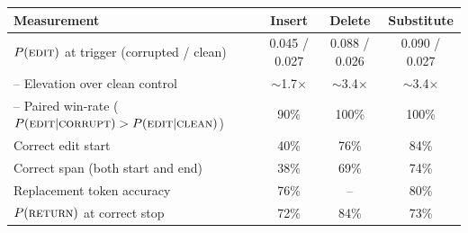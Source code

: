 

\begin{minipage}{19cm}
\centering
\small
\begin{tabular}{lccc}
    \toprule
    Measurement & Insert & Delete & Substitute \\
    \midrule
    $P(\textsc{edit})$ at trigger (corrupted / clean) & 0.045 / 0.027 & 0.088 / 0.026 & 0.090 / 0.027 \\
    \quad -- Elevation over clean control & $\sim$1.7$\times$ & $\sim$3.4$\times$ & $\sim$3.4$\times$ \\
    \quad -- Paired win-rate ($P(\textsc{edit}|\textsc{corrupt}) > P(\textsc{edit}|\textsc{clean})$) & 90\% & 100\% & 100\% \\
    Correct edit start & 40\% & 76\% & 84\% \\
    Correct span (both start and end) & 38\% & 69\% & 74\% \\
    Replacement token accuracy & 76\% & -- & 80\% \\
    $P(\textsc{return})$ at correct stop & 72\% & 84\% & 73\% \\
    \bottomrule
\end{tabular}
\end{minipage}

